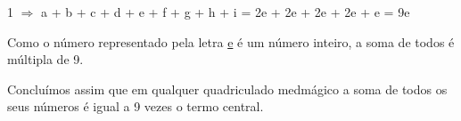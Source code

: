 \begin{solucoes}{1}
$\Rightarrow$ a + b + c + d + e + f + g + h + i = 2e + 2e + 2e + 2e + e = 9e

Como o número representado pela letra \underline{e} é um número inteiro, a soma de todos é múltipla de 9.

Concluímos assim que em qualquer quadriculado medmágico a soma de todos os seus números é igual a 9 vezes o
termo central.

\end{solucoes}